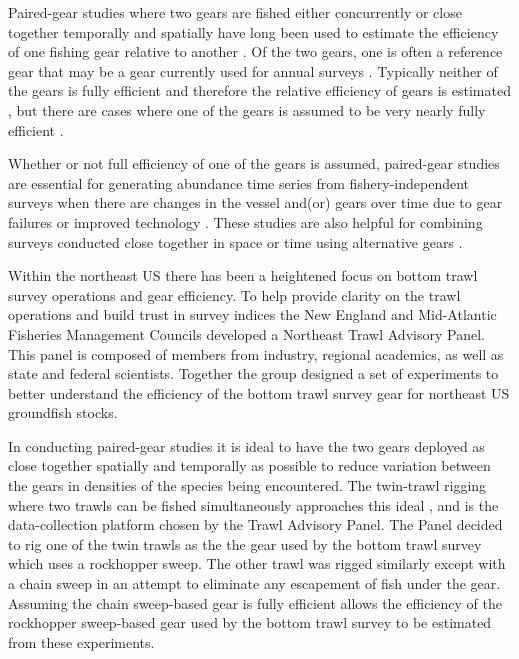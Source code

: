 \documentclass[
  12pt,
]{article}
\begin{document}
Paired-gear studies where two gears are fished either concurrently or
close together temporally and spatially have long been used to estimate
the efficiency of one fishing gear relative to another
\citep[e.g.,][]{gulland64,bourne65}. Of the two gears, one is often a
reference gear that may be a gear currently used for annual surveys
\citep[e.g.,][]{munrosomerton01}. Typically neither of the gears is
fully efficient and therefore the relative efficiency of gears is
estimated \citep[e.g.,][]{miller13,kotwickietal17}, but there are cases
where one of the gears is assumed to be very nearly fully efficient
\citep[e.g.,][]{somertonetal13, milleretal19}.

Whether or not full efficiency of one of the gears is assumed,
paired-gear studies are essential for generating abundance time series
from fishery-independent surveys when there are changes in the vessel
and(or) gears over time due to gear failures or improved technology
\citep{pelletier98}. These studies are also helpful for combining
surveys conducted close together in space or time using alternative
gears \citep{kotwickietal13}.

Within the northeast US there has been a heightened focus on bottom
trawl survey operations and gear efficiency. To help provide clarity on
the trawl operations and build trust in survey indices the New England
and Mid-Atlantic Fisheries Management Councils developed a Northeast
Trawl Advisory Panel. This panel is composed of members from industry,
regional academics, as well as state and federal scientists. Together
the group designed a set of experiments to better understand the
efficiency of the bottom trawl survey gear for northeast US groundfish
stocks.

In conducting paired-gear studies it is ideal to have the two gears
deployed as close together spatially and temporally as possible to
reduce variation between the gears in densities of the species being
encountered. The twin-trawl rigging \citep{kragetal15} where two trawls
can be fished simultaneously approaches this ideal \citep{ices96}, and
is the data-collection platform chosen by the Trawl Advisory Panel. The
Panel decided to rig one of the twin trawls as the the gear used by the
bottom trawl survey which uses a rockhopper sweep. The other trawl was
rigged similarly except with a chain sweep in an attempt to eliminate
any escapement of fish under the gear. Assuming the chain sweep-based
gear is fully efficient allows the efficiency of the rockhopper
sweep-based gear used by the bottom trawl survey to be estimated from
these experiments.
\end{document}
